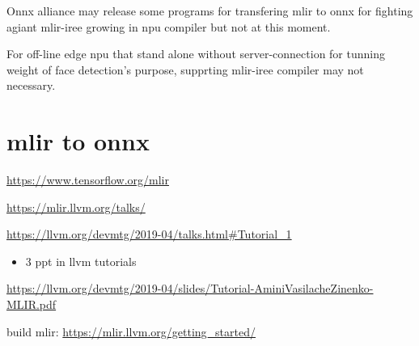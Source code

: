 \documentclass[letterpaper,10pt,english]{sphinxmanual}
\begin{document}
Onnx alliance may release some programs for transfering mlir to onnx for fighting
agiant mlir-iree growing in npu compiler but not at this moment.

For off-line edge npu that stand alone without server-connection
for tunning weight of face detection's purpose, supprting mlir-iree compiler
may not necessary.


\section{mlir to onnx}
\label{npu:mlir-to-onnx}
\url{https://www.tensorflow.org/mlir}

\url{https://mlir.llvm.org/talks/}

\url{https://llvm.org/devmtg/2019-04/talks.html\#Tutorial\_1}
\begin{itemize}
\item {} 
3 ppt in llvm tutorials

\end{itemize}

\url{https://llvm.org/devmtg/2019-04/slides/Tutorial-AminiVasilacheZinenko-MLIR.pdf}

build mlir: \url{https://mlir.llvm.org/getting\_started/}
\end{document}
